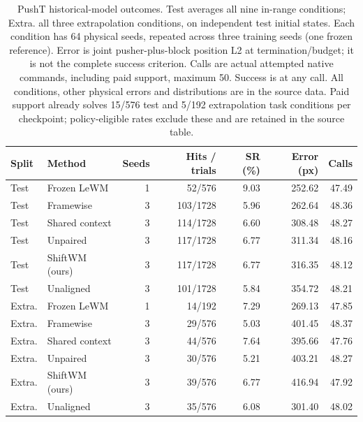 \begin{table}[tbp]
\centering\fontsize{9}{10.5}\selectfont
\setlength{\tabcolsep}{3pt}
\begin{tabular}{llrrrrr}
\toprule
Split & Method & Seeds & Hits / trials & SR (\%) & Error (px) & Calls \\
\midrule
Test & Frozen LeWM & 1 & 52/576 & 9.03 & 252.62 & 47.49 \\
Test & Framewise & 3 & 103/1728 & 5.96 & 262.64 & 48.36 \\
Test & Shared context & 3 & 114/1728 & 6.60 & 308.48 & 48.27 \\
Test & Unpaired & 3 & 117/1728 & 6.77 & 311.34 & 48.16 \\
Test & ShiftWM (ours) & 3 & 117/1728 & 6.77 & 316.35 & 48.12 \\
Test & Unaligned & 3 & 101/1728 & 5.84 & 354.72 & 48.21 \\
Extra. & Frozen LeWM & 1 & 14/192 & 7.29 & 269.13 & 47.85 \\
Extra. & Framewise & 3 & 29/576 & 5.03 & 401.45 & 48.37 \\
Extra. & Shared context & 3 & 44/576 & 7.64 & 395.66 & 47.76 \\
Extra. & Unpaired & 3 & 30/576 & 5.21 & 403.21 & 48.27 \\
Extra. & ShiftWM (ours) & 3 & 39/576 & 6.77 & 416.94 & 47.92 \\
Extra. & Unaligned & 3 & 35/576 & 6.08 & 301.40 & 48.02 \\
\bottomrule\end{tabular}
\caption{PushT historical-model outcomes. Test averages all nine in-range conditions; Extra. all three extrapolation conditions, on independent test initial states. Each condition has 64 physical seeds, repeated across three training seeds (one frozen reference). Error is joint pusher-plus-block position L2 at termination/budget; it is not the complete success criterion. Calls are actual attempted native commands, including paid support, maximum 50. Success is at any call. All conditions, other physical errors and distributions are in the source data. Paid support already solves 15/576 test and 5/192 extrapolation task conditions per checkpoint; policy-eligible rates exclude these and are retained in the source table.}
\label{tab:physical-pusht}
\end{table}

